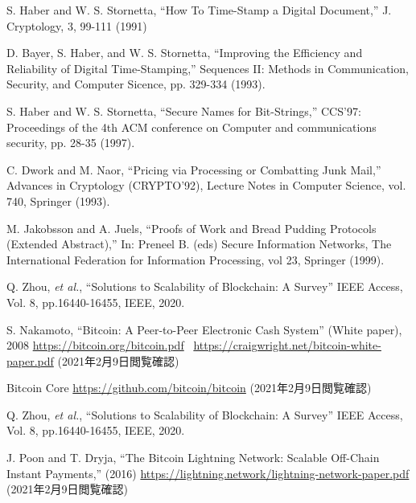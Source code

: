 \documentclass[graybox]{svmult}
\begin{document}
\begin{thebibliography}{99}

  S. Haber and W. S. Stornetta, 
  ``How To Time-Stamp a Digital Document,''
  J. Cryptology, 3, 99-111 (1991)

  D. Bayer, S. Haber, and W. S. Stornetta,
  ``Improving the Efficiency and Reliability of Digital Time-Stamping,''
  Sequences II: Methods in Communication, Security, and Computer Sicence, 
  pp. 329-334 (1993).

  S. Haber and W. S. Stornetta, 
  ``Secure Names for Bit-Strings,''
  CCS'97: Proceedings of the 4th ACM conference on Computer and 
  communications security, pp. 28-35 (1997).


  C. Dwork and M. Naor, 
  ``Pricing via Processing or Combatting Junk Mail,''
  Advances in Cryptology (CRYPTO'92), 
  Lecture Notes in Computer Science, vol. 740, Springer (1993). 


  M. Jakobsson and A. Juels, 
  ``Proofs of Work and Bread Pudding Protocols (Extended Abstract),''
  In: Preneel B. (eds) Secure Information Networks, 
  The International Federation for Information Processing, 
  vol 23, Springer (1999).


  Q. Zhou, \textit{et al.}, 
  ``Solutions to Scalability of Blockchain: A Survey''
  IEEE Access, Vol. 8, pp.16440-16455, IEEE, 2020. 




  S. Nakamoto, 
  ``Bitcoin: A Peer-to-Peer Electronic Cash System''
  (White paper), 2008 
  \url{https://bitcoin.org/bitcoin.pdf} \ 
  \url{https://craigwright.net/bitcoin-white-}\\
  \url{paper.pdf}
  (2021年2月9日閲覧確認)


  Bitcoin Core 
  \url{https://github.com/bitcoin/bitcoin}
  (2021年2月9日閲覧確認)


  Q. Zhou, \textit{et al.}, 
  ``Solutions to Scalability of Blockchain: A Survey''
  IEEE Access, Vol. 8, pp.16440-16455, IEEE, 2020. 


  J. Poon and T. Dryja, 
  ``The Bitcoin Lightning Network: Scalable Off-Chain Instant Payments,'' 
  (2016) \url{https://lightning.network/lightning-network-paper.pdf}
  (2021年2月9日閲覧確認)



\end{thebibliography}
\end{document}
